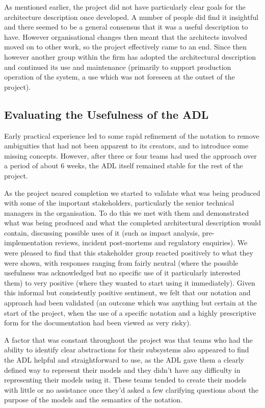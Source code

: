   As mentioned earlier, the project did not have particularly clear goals for the architecture description once developed.  A number of people did find it insightful and there seemed to be a general consensus that it was a useful description to have.  However organisational changes then meant that the architects involved moved on to other work, so the project effectively came to an end.  Since then however another group within the firm has adopted the architectural description and continued its use and maintenance (primarily to support production operation of the system, a use which was not foreseen at the outset of the project).

  

\subsection{Evaluating the Usefulness of the ADL}

  Early practical experience led to some rapid refinement of the notation to remove ambiguities that had not been apparent to its creators, and to introduce some missing concepts.  However, after three or four teams had used the approach over a period of about 6 weeks, the ADL itself remained stable for the rest of the project.

  As the project neared completion we started to validate what was being produced with some of the important stakeholders, particularly the senior technical managers in the organisation.  To do this we met with them and demonstrated what was being produced and what the completed architectural description would contain, discussing possible uses of it (such as impact analysis, pre-implementation reviews, incident post-mortems and regulatory enquiries).  We were pleased to find that this stakeholder group reacted positively to what they were shown, with responses ranging from fairly neutral (where the possible usefulness was acknowledged but no specific use of it particularly interested them) to very positive (where they wanted to start using it immediately).  Given this informal but consistently positive sentiment, we felt that our notation and approach had been validated (an outcome which was anything but certain at the start of the project, when the use of a specific notation and a highly prescriptive form for the documentation had been viewed as very risky). 

  A factor that was constant throughout the project was that teams who had the ability to identify clear abstractions for their subsystems also appeared to find the ADL helpful and straightforward to use, as the ADL gave them a clearly defined way to represent their models and they didn't have any difficulty in representing their models using it.  These teams tended to create their models with little or no assistance once they'd asked a few clarifying questions about the purpose of the models and the semantics of the notation.

